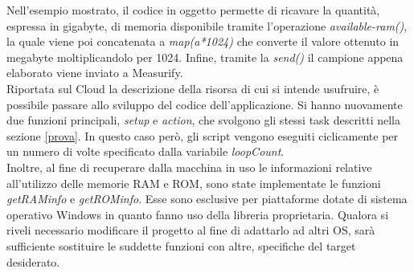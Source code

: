 Nell'esempio mostrato, il codice in oggetto permette di ricavare la quantità, espressa in gigabyte, di memoria disponibile tramite l’operazione \textit{available-ram()}, la quale viene poi concatenata a \textit{map(a*1024)} che converte il valore ottenuto in megabyte moltiplicandolo per 1024. Infine, tramite la \textit{send()} il campione appena elaborato viene inviato a Measurify.\\
Riportata sul Cloud la descrizione della risorsa di cui si intende usufruire, è possibile passare allo sviluppo del codice dell'applicazione. Si hanno nuovamente due funzioni principali, \textit{setup} e \textit{action}, che svolgono gli stessi task descritti nella sezione \ref{prova}. In questo caso però, gli script vengono eseguiti ciclicamente per un numero di volte specificato dalla variabile \textit{loopCount}.\\ Inoltre, al fine di recuperare dalla macchina in uso le informazioni relative all’utilizzo delle memorie RAM e ROM, sono state implementate le funzioni \textit{getRAMinfo} e  \textit{getROMinfo}. Esse sono esclusive per piattaforme dotate di sistema operativo Windows in quanto fanno uso della libreria proprietaria. Qualora si riveli necessario modificare il progetto al fine di adattarlo ad altri OS, sarà sufficiente sostituire le suddette funzioni con altre, specifiche del target desiderato.\\

